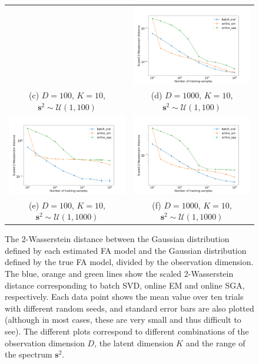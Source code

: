 \documentclass[msc,deptreport.inf]{infthesis} %
\newcommand{\matr}[1]{\mathbf{#1}}
\begin{document}
\begin{figure}[!htbp]
\begin{tabular}{cc}
		 & \includegraphics[width=70mm]{plots/online_fa_wasserstein__observation_dim=1000__latent_dim=10__spectrum_min=1__spectrum_max=100.png} \\
		 (c) $D=100$, $K=10$, $\matr{s}^2 \sim \mathcal{U}(1, 100)$ 
		 & (d) $D=1000$, $K=10$, $\matr{s}^2 \sim \mathcal{U}(1, 100)$\\[6pt]
		 \includegraphics[width=70mm]{plots/online_fa_wasserstein__observation_dim=100__latent_dim=10__spectrum_min=1__spectrum_max=1000.png} 
		 & \includegraphics[width=70mm]{plots/online_fa_wasserstein__observation_dim=1000__latent_dim=10__spectrum_min=1__spectrum_max=1000.png} \\
		 (e) $D=100$, $K=10$, $\matr{s}^2 \sim \mathcal{U}(1, 1000)$ 
		 & (f) $D=1000$, $K=10$, $\matr{s}^2 \sim \mathcal{U}(1, 1000)$\\[6pt]
	\end{tabular}
	\caption{The 2-Wasserstein distance between the Gaussian distribution defined by each estimated FA model and the Gaussian distribution defined by the true FA model, divided by the observation dimension. The blue, orange and green lines show the scaled 2-Wasserstein distance corresponding to batch SVD, online EM and online SGA, respectively. Each data point shows the mean value over ten trials with different random seeds, and standard error bars are also plotted (although in most cases, these are very small and thus difficult to see). The different plots correspond to different combinations of the observation dimension $D$, the latent dimension $K$ and the range of the spectrum $\matr{s}^2$.}
	\label{fig:fa_wasserstein}
\end{figure}
\end{document}

